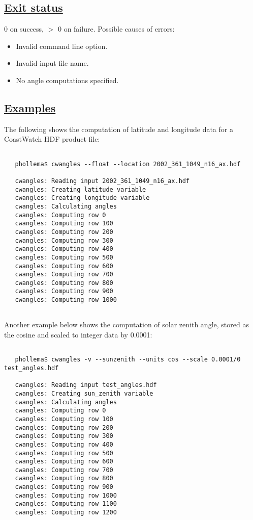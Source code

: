 \subsection*{\underline{Exit status}}


 0 on success, $>$ 0 on failure. Possible causes of errors:
\begin{itemize}
\item  Invalid command line option. 
\item  Invalid input file name. 
\item  No angle computations specified. 

\end{itemize}
\subsection*{\underline{Examples}}


  The following shows the computation of latitude and longitude data for a CoastWatch HDF product file:
\begin{verbatim}
 
   phollema$ cwangles --float --location 2002_361_1049_n16_ax.hdf

   cwangles: Reading input 2002_361_1049_n16_ax.hdf
   cwangles: Creating latitude variable
   cwangles: Creating longitude variable
   cwangles: Calculating angles
   cwangles: Computing row 0
   cwangles: Computing row 100
   cwangles: Computing row 200
   cwangles: Computing row 300
   cwangles: Computing row 400
   cwangles: Computing row 500
   cwangles: Computing row 600
   cwangles: Computing row 700
   cwangles: Computing row 800
   cwangles: Computing row 900
   cwangles: Computing row 1000
 
\end{verbatim}


 Another example below shows the computation of solar zenith angle, stored as the cosine and scaled to integer data by 0.0001:
\begin{verbatim}
 
   phollema$ cwangles -v --sunzenith --units cos --scale 0.0001/0 test_angles.hdf

   cwangles: Reading input test_angles.hdf
   cwangles: Creating sun_zenith variable
   cwangles: Calculating angles
   cwangles: Computing row 0
   cwangles: Computing row 100
   cwangles: Computing row 200
   cwangles: Computing row 300
   cwangles: Computing row 400
   cwangles: Computing row 500
   cwangles: Computing row 600
   cwangles: Computing row 700
   cwangles: Computing row 800
   cwangles: Computing row 900
   cwangles: Computing row 1000
   cwangles: Computing row 1100
   cwangles: Computing row 1200
 
\end{verbatim}

